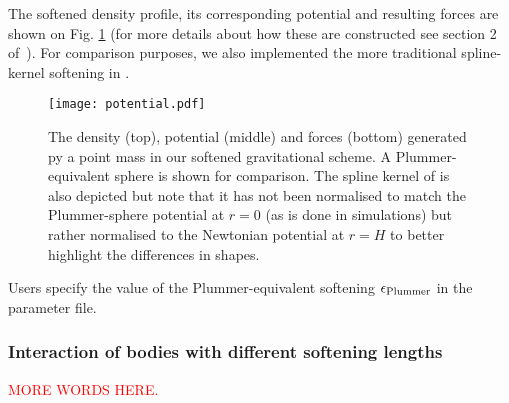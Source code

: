 The softened density profile, its corresponding potential and
resulting forces are shown on Fig. \ref{fig:fmm:softening} (for more
details about how these are constructed see section 2
of~\cite{Price2007}). For comparison purposes, we also implemented the
more traditional spline-kernel softening in \swift.
\begin{figure}
\texttt{[image: potential.pdf]}
\caption{The density (top), potential (middle) and forces (bottom)
  generated py a point mass in our softened gravitational scheme.  A
  Plummer-equivalent sphere is shown for comparison. The spline kernel
  of \citet{Monaghan1985} is also depicted but note that it has not
  been normalised to match the Plummer-sphere potential at $r=0$ (as
  is done in simulations) but rather normalised to the Newtonian
  potential at $r=H$ to better highlight the differences in shapes.}
\label{fig:fmm:softening}
\end{figure}
Users specify the value of the Plummer-equivalent softening
$\epsilon_{\rm Plummer}$ in the parameter file.

\subsubsection{Interaction of bodies with different softening lengths}

\textcolor{red}{MORE WORDS HERE.}\\
